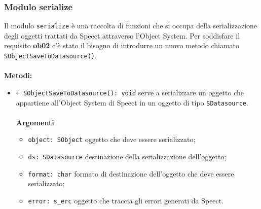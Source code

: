\subsubsection{Modulo serialize}
Il modulo \texttt{serialize} è una raccolta di funzioni che si occupa della serializzazione degli oggetti trattati da Speect attraverso l'Object System.
Per soddisfare il requisito \textbf{ob02} c'è stato il bisogno di introdurre un nuovo metodo chiamato \texttt{SObjectSaveToDatasource()}.\\\\
\textbf{Metodi:}
\begin{itemize}
	\item \texttt{+ SObjectSaveToDatasource(): void} serve a serializzare un oggetto che appartiene all'Object System di Speect in un oggetto di tipo \texttt{SDatasource}.\\\\
	\textbf{Argomenti}
	\begin{itemize}
		\item \texttt{object: SObject} oggetto che deve essere serializzato;
		\item \texttt{ds: SDatasource} destinazione della serializzazione dell'oggetto;
		\item \texttt{format: char} formato di destinazione dell'oggetto che deve essere serializzato;
		\item \texttt{error: s\_erc} oggetto che traccia gli errori generati da Speect.
	\end{itemize}
\end{itemize}

